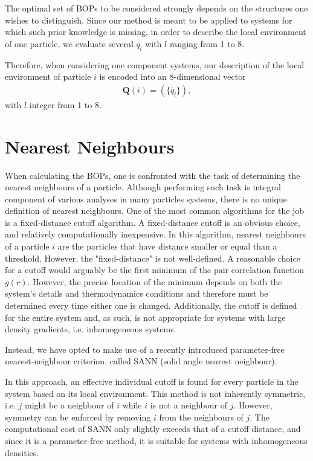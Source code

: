 \documentclass{report}
\begin{document}
	The optimal set of BOPs to be considered strongly depends on the structures one wishes to distinguish. Since our method is meant to be applied to systems for which such prior knowledge is missing, in order to describe the local environment of one particle, we evaluate several $\bar q_l$ with $l$ ranging from 1 to 8.
	
	Therefore, when considering one component systems, our description of the local environment of particle $i$ is encoded into an $8$-dimensional vector
	\begin{align}
		\bm{Q}(i)=(\{\bar{q}_l\}),
	\end{align}
	with $l$ integer from 1 to 8.
	
\section{Nearest Neighbours}

When calculating the BOPs, one is confronted with the task of determining the nearest neighbours of a particle. Although performing such task is integral component of various analyses in many particles systems, there is no unique definition of nearest neighbours. One of the most common algorithms for the job is a fixed-distance cutoff algorithm. A fixed-distance cutoff is an obvious choice, and relatively computationally inexpensive. In this algorithm, nearest neighbours of a particle $i$ are the particles that have distance smaller or equal than a threshold. However, the "fixed-distance" is not well-defined. A reasonable choice for a cutoff would arguably be the first minimum of the pair correlation function $g(r)$. However, the precise location of the minimum depends on both the system's details and thermodynamics conditions and therefore must be determined every time either one is changed. Additionally, the cutoff is defined for the entire system and, as such, is not appropriate for systems with large density gradients, i.e. inhomogeneous systems. 

Instead, we have opted to make use of a recently introduced parameter-free nearest-neighbour criterion, called SANN (solid angle nearest neighbour). 




In this approach, an effective individual cutoff is found for every particle in the system based on its local environment. This method is not inherently symmetric, i.e. $j$ might be a neighbour of $i$ while $i$ is not a neighbour of $j$. However, symmetry can be enforced by removing $i$ from the neighbours of $j$. The computational cost of SANN only slightly exceeds that of a cutoff distance, and since it is a parameter-free method, it is suitable for systems with inhomogeneous densities.
\end{document}
